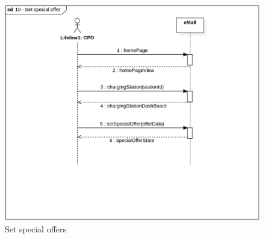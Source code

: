 \begin{figure}[H]
    \begin{center}
        \includegraphics[width=\textwidth]{img/sequence/special.png}
        \caption{Set special offers}
    \end{center}
\end{figure}
